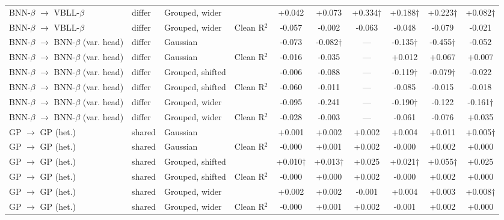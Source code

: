 \begin{landscape}
{\begin{longtable}{llllcccccc}
BNN-$\beta$ $\rightarrow$ VBLL-$\beta$ & differ & Grouped, wider & \aucnorm{} & +0.042 & +0.073 & +0.334† & +0.188† & +0.223† & +0.082† \\
BNN-$\beta$ $\rightarrow$ VBLL-$\beta$ & differ & Grouped, wider & Clean R$^2$ & -0.057 & -0.002 & -0.063 & -0.048 & -0.079 & -0.021 \\
BNN-$\beta$ $\rightarrow$ BNN-$\beta$ (var. head) & differ & Gaussian & \aucnorm{} & -0.073 & -0.082† & --- & -0.135† & -0.455† & -0.052 \\
BNN-$\beta$ $\rightarrow$ BNN-$\beta$ (var. head) & differ & Gaussian & Clean R$^2$ & -0.016 & -0.035 & --- & +0.012 & +0.067 & +0.007 \\
BNN-$\beta$ $\rightarrow$ BNN-$\beta$ (var. head) & differ & Grouped, shifted & \aucnorm{} & -0.006 & -0.088 & --- & -0.119† & -0.079† & -0.022 \\
BNN-$\beta$ $\rightarrow$ BNN-$\beta$ (var. head) & differ & Grouped, shifted & Clean R$^2$ & -0.060 & -0.011 & --- & -0.085 & -0.015 & -0.018 \\
BNN-$\beta$ $\rightarrow$ BNN-$\beta$ (var. head) & differ & Grouped, wider & \aucnorm{} & -0.095 & -0.241 & --- & -0.190† & -0.122 & -0.161† \\
BNN-$\beta$ $\rightarrow$ BNN-$\beta$ (var. head) & differ & Grouped, wider & Clean R$^2$ & -0.028 & -0.003 & --- & -0.061 & -0.076 & +0.035 \\
GP $\rightarrow$ GP (het.) & shared & Gaussian & \aucnorm{} & +0.001 & +0.002 & +0.002 & +0.004 & +0.011 & +0.005† \\
GP $\rightarrow$ GP (het.) & shared & Gaussian & Clean R$^2$ & -0.000 & +0.001 & +0.002 & -0.000 & +0.002 & +0.000 \\
GP $\rightarrow$ GP (het.) & shared & Grouped, shifted & \aucnorm{} & +0.010† & +0.013† & +0.025 & +0.021† & +0.055† & +0.025 \\
GP $\rightarrow$ GP (het.) & shared & Grouped, shifted & Clean R$^2$ & -0.000 & +0.000 & +0.002 & -0.000 & +0.002 & +0.000 \\
GP $\rightarrow$ GP (het.) & shared & Grouped, wider & \aucnorm{} & +0.002 & +0.002 & -0.001 & +0.004 & +0.003 & +0.008† \\
GP $\rightarrow$ GP (het.) & shared & Grouped, wider & Clean R$^2$ & -0.000 & +0.001 & +0.002 & -0.001 & +0.002 & +0.000 \\
\bottomrule
\end{longtable}}


\end{landscape}
